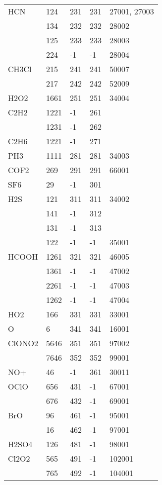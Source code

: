 \begin{longtable}{lllll}
\hline                  
  HCN& 124&  231&   231&  27001, 27003\\
     & 134&  232&   232&  28002\\
     & 125&  233&   233&  28003\\
     & 224&  -1&    -1&  28004\\
\hline                  
  CH3Cl& 215&  241&   241&  50007\\
       & 217&  242&   242&  52009\\
\hline                  
  H2O2& 1661&  251&   251&  34004\\
\hline                  
  C2H2& 1221&  -1&   261&\\
      & 1231&  -1&   262&\\
\hline                  
  C2H6& 1221&  -1&   271&\\
\hline
  PH3& 1111&  281&   281&  34003\\
\hline                  
  COF2&  269&  291&   291&  66001\\
\hline                  
  SF6& 29&  -1&   301&\\
\hline                  
  H2S& 121&  311&   311&  34002\\
     & 141&  -1&   312&\\
     & 131&  -1&   313&\\
     & 122&  -1&    -1&  35001\\
\hline                  
  HCOOH& 1261&  321&   321&  46005\\
       & 1361&  -1&    -1&  47002\\
       & 2261&  -1&    -1&  47003\\
       & 1262&  -1&    -1&  47004\\
\hline                  
  HO2& 166&  331&   331&  33001\\
\hline                  
  O& 6&  341&   341&  16001\\
\hline                  
  ClONO2& 5646&  351&   351&  97002\\
        & 7646&  352&   352&  99001\\
\hline                  
  NO+& 46&  -1&   361&  30011\\
\hline                  
  OClO& 656&  431&    -1&  67001\\
      & 676&  432&    -1&  69001\\
\hline                  
  BrO& 96&  461&    -1&  95001\\
     & 16&  462&    -1&  97001\\
\hline                  
  H2SO4& 126&  481&    -1&  98001\\
\hline                  
  Cl2O2& 565&  491&    -1&  102001\\
       & 765&  492&    -1&  104001\\
\end{longtable}
 

